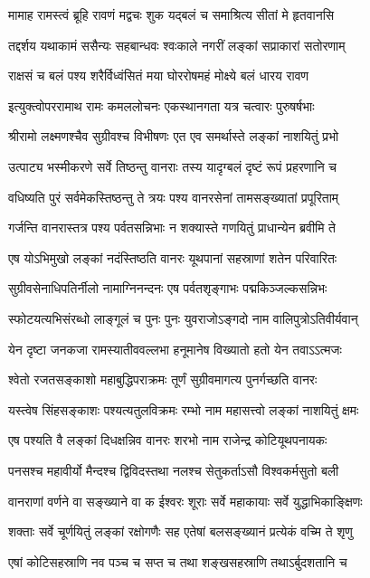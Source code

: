 \twolineshloka
{मामाह रामस्त्वं ब्रूहि रावणं मद्वचः शुक}
{यद्बलं च समाश्रित्य सीतां मे हृतवानसि} %

\twolineshloka
{तद्दर्शय यथाकामं ससैन्यः सहबान्धवः}
{श्वःकाले नगरीं लङ्कां सप्राकारां सतोरणाम्} %

\twolineshloka
{राक्षसं च बलं पश्य शरैर्विध्वंसितं मया}
{घोररोषमहं मोक्ष्ये बलं धारय रावण} %

\twolineshloka
{इत्युक्त्वोपररामाथ रामः कमललोचनः}
{एकस्थानगता यत्र चत्वारः पुरुषर्षभाः} %

\twolineshloka
{श्रीरामो लक्ष्मणश्चैव सुग्रीवश्च विभीषणः}
{एत एव समर्थास्ते लङ्कां नाशयितुं प्रभो} %

\twolineshloka
{उत्पाट्य भस्मीकरणे सर्वे तिष्ठन्तु वानराः}
{तस्य यादृग्बलं दृष्टं रूपं प्रहरणानि च} %

\twolineshloka
{वधिष्यति पुरं सर्वमेकस्तिष्ठन्तु ते त्रयः}
{पश्य वानरसेनां तामसङ्ख्यातां प्रपूरिताम्} %

\twolineshloka
{गर्जन्ति वानरास्तत्र पश्य पर्वतसन्निभाः}
{न शक्यास्ते गणयितुं प्राधान्येन ब्रवीमि ते} %

\twolineshloka
{एष योऽभिमुखो लङ्कां नदंस्तिष्ठति वानरः}
{यूथपानां सहस्राणां शतेन परिवारितः} %

\twolineshloka
{सुग्रीवसेनाधिपतिर्नीलो नामाग्निनन्दनः}
{एष पर्वतशृङ्गाभः पद्मकिञ्जल्कसन्निभः} %

\twolineshloka
{स्फोटयत्यभिसंरब्धो लाङ्गूलं च पुनः पुनः}
{युवराजोऽङ्गदो नाम वालिपुत्रोऽतिवीर्यवान्} %

\twolineshloka
{येन दृष्टा जनकजा रामस्यातीववल्लभा}
{हनूमानेष विख्यातो हतो येन तवाऽऽत्मजः} %

\twolineshloka
{श्वेतो रजतसङ्काशो महाबुद्धिपराक्रमः}
{तूर्णं सुग्रीवमागत्य पुनर्गच्छति वानरः} %

\twolineshloka
{यस्त्वेष सिंहसङ्काशः पश्यत्यतुलविक्रमः}
{रम्भो नाम महासत्त्वो लङ्कां नाशयितुं क्षमः} %

\twolineshloka
{एष पश्यति वै लङ्कां दिधक्षन्निव वानरः}
{शरभो नाम राजेन्द्र कोटियूथपनायकः} %

\twolineshloka
{पनसश्च महावीर्यो मैन्दश्च द्विविदस्तथा}
{नलश्च सेतुकर्ताऽसौ विश्वकर्मसुतो बली} %

\twolineshloka
{वानराणां वर्णने वा सङ्ख्याने वा क ईश्वरः}
{शूराः सर्वे महाकायाः सर्वे युद्धाभिकाङ्क्षिणः} %

\twolineshloka
{शक्ताः सर्वे चूर्णयितुं लङ्कां रक्षोगणैः सह}
{एतेषां बलसङ्ख्यानं प्रत्येकं वच्मि ते शृणु} %

\twolineshloka
{एषां कोटिसहस्राणि नव पञ्च च सप्त च}
{तथा शङ्खसहस्राणि तथाऽर्बुदशतानि च} %

